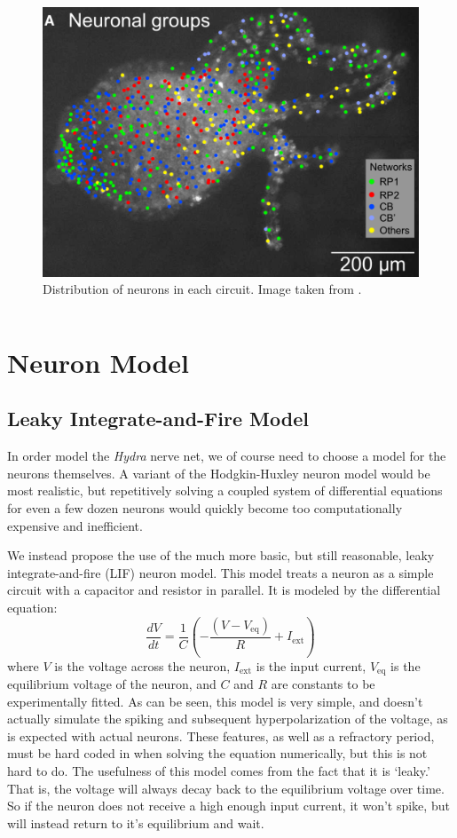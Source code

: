 \documentclass{article}
\begin{document}
\begin{figure}[!htb]
    \centering
    \includegraphics[scale=0.5]{old/hydra_map.png}
    \caption{Distribution of neurons in each circuit. Image taken from \cite{hydra}.}
    \label{fig:map}
\end{figure}
\vspace{1in}
\newpage
$$ \quad $$
\section{Neuron Model}
\subsection{Leaky Integrate-and-Fire Model}
In order model the \textit{Hydra} nerve net, we of course need to choose a model for the neurons themselves. A variant of the Hodgkin-Huxley neuron model would be most realistic, but repetitively solving a coupled system of differential equations for even a few dozen neurons would quickly become too computationally expensive and inefficient.

We instead propose the use of the much more basic, but still reasonable, leaky integrate-and-fire (LIF) neuron model. This model treats a neuron as a simple circuit with a capacitor and resistor in parallel. It is modeled by the differential equation:
\begin{equation}
\frac{dV}{dt}=\frac{1}{C}\left(-\frac{(V-V_{\mathrm{eq}})}{R}+I_{\mathrm{ext}}\right)
\end{equation}
where $V$ is the voltage across the neuron, $I_{\mathrm{ext}}$ is the input current, $V_{\mathrm{eq}}$ is the equilibrium voltage of the neuron, and $C$ and $R$ are constants to be experimentally fitted. 
As can be seen, this model is very simple, and doesn't actually simulate the spiking and subsequent hyperpolarization of the voltage, as is expected with actual neurons. These features, as well as a refractory period, must be hard coded in when solving the equation numerically, but this is not hard to do. The usefulness of this model comes from the fact that it is `leaky.' That is, the voltage will always decay back to the equilibrium voltage over time. So if the neuron does not receive a high enough input current, it won't spike, but will instead return to it's equilibrium and wait.
\end{document}

